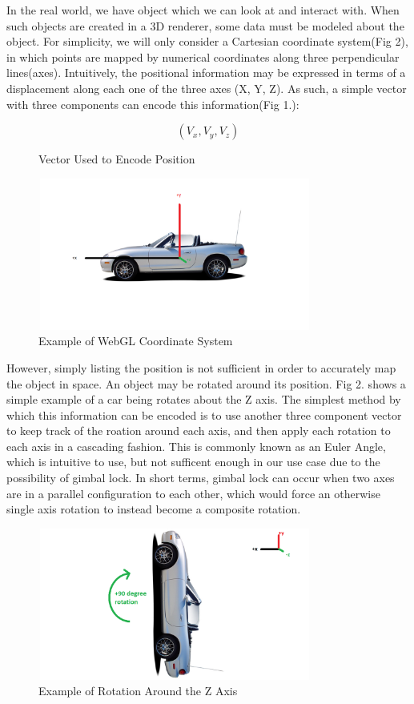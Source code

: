 \documentclass[conference]{IEEEtran}
\begin{document}
In the real world, we have object which we can look at and interact with. When such objects are created in a 3D renderer,
some data must be modeled about the object. For simplicity, we will only consider a Cartesian coordinate system(Fig 2), in which points are mapped 
by numerical coordinates along three perpendicular lines(axes). Intuitively, the positional information may be expressed in terms of a displacement 
along each one of the three axes (X, Y, Z). As such, a simple vector with three components can encode this information(Fig 1.): 

\begin{figure}[htbp]
\[ (V_{x}, V_{y}, V_{z}) \]
\caption{Vector Used to Encode Position}
\end{figure}

\begin{figure}[htbp]
\centerline{\includegraphics [width = 9cm, height = 5cm] {fig1.png}}
\caption{Example of WebGL Coordinate System}
\end{figure}

However, simply listing the position is not sufficient in order to accurately map the object in space. An object may be rotated 
around its position. Fig 2. shows a simple example of a car being rotates about the Z axis. The simplest method by which this information can be encoded 
is to use another three component vector to keep track of the roation around each axis, and then apply each rotation to each axis in a cascading fashion. 
This is commonly known as an Euler Angle, which is intuitive to use, but not sufficent enough in our use case due to the possibility of gimbal lock. 
In short terms, gimbal lock can occur when two axes are in a parallel configuration to each other, which would force an otherwise single axis rotation to instead 
become a composite rotation. 


\begin{figure}[htbp]
\centerline{\includegraphics [width = 9cm, height = 5cm] {fig2.png}}
\caption{Example of Rotation Around the Z Axis}
\end{figure}
\end{document}
